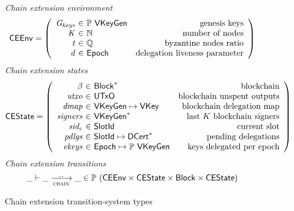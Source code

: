 \begin{figure}
  \emph{Chain extension environment}
  \begin{equation*}
    \CEEnv =
    \left(
      \begin{array}{r@{~\in~}lr}
        \var{\Gkeys} & \powerset{\VKeyGen} & \text{genesis keys}\\
        \var{K} & \mathbb{N} & \text{number of nodes}\\
        \var{t} & \mathbb{Q} & \text{byzantine nodes ratio}\\
        \var{d} & \Epoch & \text{delegation liveness parameter}\\
      \end{array}
    \right)
  \end{equation*}
  \emph{Chain extension states}
  \begin{equation*}
    \CEState =
    \left(
      \begin{array}{r@{~\in~}lr}
        \beta & \seqof{\Block} & \text{blockchain}\\
        \var{utxo} & \UTxO & \text{blockchain unspent outputs}\\
        \var{dmap} & \VKeyGen \mapsto \VKey & \text{blockchain delegation map}\\
        \var{signers} & \seqof{\VKeyGen} & \text{last $K$ blockchain signers}\\
        \var{sid_c} & \SlotId & \text{current slot}\\
        \var{pdlgs} & \SlotId \mapsto \seqof{\DCert} & \text{pending delegations}\\
        \var{ekeys} & \Epoch \mapsto \powerset{\VKeyGen} & \text{keys delegated per epoch}
      \end{array}
    \right)
  \end{equation*}
  \emph{Chain extension transitions}
  \begin{equation*}
    \_ \vdash \_ \trans{chain}{\_} \_ \in
      \powerset (\CEEnv \times \CEState \times \Block \times \CEState)
  \end{equation*}
  \caption{Chain extension transition-system types}
  \label{fig:chain-ts-types}
\end{figure}

